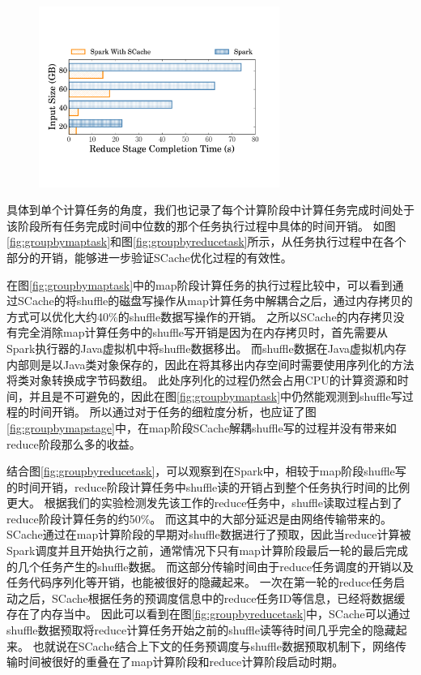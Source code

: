 \begin{figure}[!htp]
	\centering
	\includegraphics[width=0.7\textwidth]{../../PPoPP-2018/fig/groupbyreducestage.pdf}
\end{figure}

具体到单个计算任务的角度，我们也记录了每个计算阶段中计算任务完成时间处于该阶段所有任务完成时间中位数的那个任务执行过程中具体的时间开销。
如图\ref{fig:groupbymaptask}和图\ref{fig:groupbyreducetask}所示，从任务执行过程中在各个部分的开销，能够进一步验证SCache优化过程的有效性。

在图\ref{fig:groupbymaptask}中的map阶段计算任务的执行过程比较中，可以看到通过SCache的将shuffle的磁盘写操作从map计算任务中解耦合之后，通过内存拷贝的方式可以优化大约40\%的shuffle数据写操作的开销。
之所以SCache的内存拷贝没有完全消除map计算任务中的shuffle写开销是因为在内存拷贝时，首先需要从Spark执行器的Java虚拟机中将shuffle数据移出。
而shuffle数据在Java虚拟机内存内部则是以Java类对象保存的，因此在将其移出内存空间时需要使用序列化的方法将类对象转换成字节码数组。
此处序列化的过程仍然会占用CPU的计算资源和时间\cite{makingsense}，并且是不可避免的，因此在图\ref{fig:groupbymaptask}中仍然能观测到shuffle写过程的时间开销。
所以通过对于任务的细粒度分析，也应证了图\ref{fig:groupbymapstage}中，在map阶段SCache解耦shuffle写的过程并没有带来如reduce阶段那么多的收益。

结合图\ref{fig:groupbyreducetask}，可以观察到在Spark中，相较于map阶段shuffle写的时间开销，reduce阶段计算任务中shuffle读的开销占到整个任务执行时间的比例更大。
根据我们的实验检测发先该工作的reduce任务中，shuffle读取过程占到了reduce阶段计算任务的约50\%。
而这其中的大部分延迟是由网络传输带来的。
SCache通过在map计算阶段的早期对shuffle数据进行了预取，因此当reduce计算被Spark调度并且开始执行之前，通常情况下只有map计算阶段最后一轮的最后完成的几个任务产生的shuffle数据。
而这部分传输时间由于reduce任务调度的开销以及任务代码序列化等开销，也能被很好的隐藏起来。
一次在第一轮的reduce任务启动之后，SCache根据任务的预调度信息中的reduce任务ID等信息，已经将数据缓存在了内存当中。
因此可以看到在图\ref{fig:groupbyreducetask}中，SCache可以通过shuffle数据预取将reduce计算任务开始之前的shuffle读等待时间几乎完全的隐藏起来。
也就说在SCache结合上下文的任务预调度与shuffle数据预取机制下，网络传输时间被很好的重叠在了map计算阶段和reduce计算阶段启动时期。

